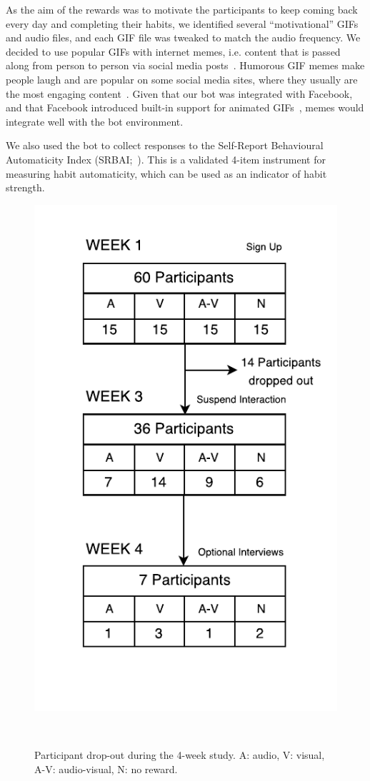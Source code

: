 \documentclass{scaffold/sigchi}
\begin{document}
As the aim of the rewards was to motivate the participants to keep coming back every day and completing their habits, we identified several ``motivational'' GIFs and audio files, and each GIF file was tweaked to match the audio frequency. We decided to use popular GIFs with internet memes, i.e. content that is passed along from person to person via social media posts~\cite{meme_definition}. Humorous GIF memes make people laugh and are popular on some social media sites, where they usually are the most engaging content~\cite{meme_gifs_are_good}. Given that our bot was integrated with Facebook, and that Facebook introduced built-in support for animated GIFs~\cite{fb_gif_rollout}, memes would integrate well with the bot environment. 

We also used the bot to collect responses to the Self-Report Behavioural Automaticity Index (SRBAI;~\cite{article_4q_SRBAI}). This is a validated 4-item instrument for measuring habit automaticity, which can be used as an indicator of habit strength. %

\begin{figure}
  \centering
  \includegraphics[width=0.7\columnwidth]{figures/study-flow.pdf}
  \caption{Participant drop-out during the 4-week study. A: audio, V: visual, A-V: audio-visual, N: no reward.}~\label{fig:study_dropout}
\end{figure}
\end{document}

